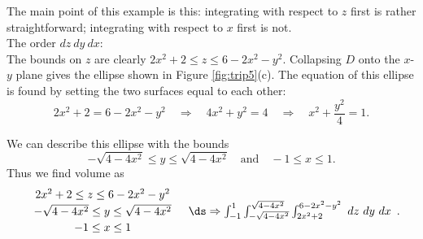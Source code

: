 {The main point of this example is this: integrating with respect to $z$ first is rather straightforward; integrating with respect to $x$ first is not.\\

\noindent The order $dz\ dy\ dx$:\\

The bounds on $z$ are clearly $2x^2+2\leq z\leq 6-2x^2-y^2$. Collapsing $D$ onto the $x$-$y$ plane gives the ellipse shown in Figure \ref{fig:trip5}(c). The equation of this ellipse is found by setting the two surfaces equal to each other: 
$$2x^2+2 = 6-2x^2-y^2\quad \Rightarrow\quad 4x^2+y^2=4\quad \Rightarrow\quad x^2+\frac{y^2}4=1.$$


\baselineskip

We can describe this ellipse with the bounds 
$$-\sqrt{4-4x^2} \leq y\leq \sqrt{4-4x^2}\quad \text{and}\quad -1\leq x\leq 1.$$ Thus we find volume as
$$\begin{array}{cc}
		\begin{array}{c}
		2x^2+2\leq z\leq 6-2x^2-y^2\\[2pt]
		-\sqrt{4-4x^2}\leq y\leq \sqrt{4-4x^2}\\[2pt]
		-1\leq x\leq 1
		\end{array} 
		& 
		\ds \Rightarrow \int_{-1}^1\int_{-\sqrt{4-4x^2}}^{\sqrt{4-4x^2}}\int_{2x^2+2}^{6-2x^2-y^2}\ dz\ dy\ dx 
	\end{array}.
$$


}

